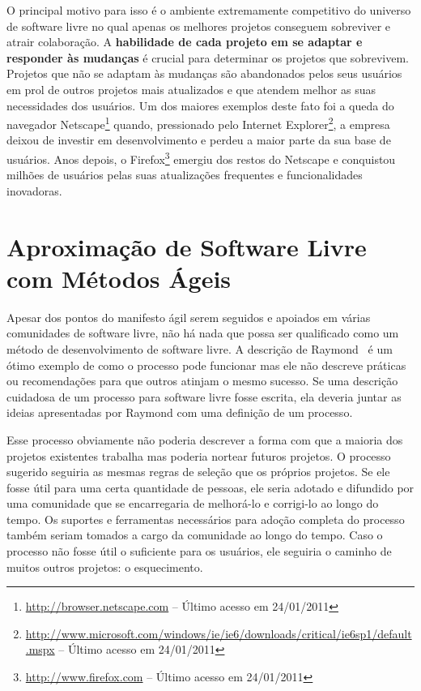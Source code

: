 O principal motivo para isso é o ambiente extremamente competitivo do
universo de software livre no qual apenas os melhores projetos
conseguem sobreviver e atrair colaboração. A \textbf{habilidade de
  cada projeto em se adaptar e responder às mudanças} é crucial para
determinar os projetos que sobrevivem.  Projetos que não se adaptam às
mudanças são abandonados pelos seus usuários em prol de outros
projetos mais atualizados e que atendem melhor as suas necessidades
dos usuários.  Um dos maiores exemplos deste fato foi a queda do
navegador Netscape\footnote{\url{http://browser.netscape.com} --
  Último acesso em 24/01/2011} quando, pressionado pelo Internet
Explorer\footnote{\url{http://www.microsoft.com/windows/ie/ie6/downloads/critical/ie6sp1/default.mspx}
  -- Último acesso em 24/01/2011}, a empresa deixou de investir em
desenvolvimento e perdeu a maior parte da sua base de usuários. Anos
depois, o Firefox\footnote{\url{http://www.firefox.com} -- Último
  acesso em 24/01/2011} emergiu dos restos do Netscape e conquistou
milhões de usuários pelas suas atualizações frequentes e
funcionalidades inovadoras.

\section{Aproximação de Software Livre com Métodos Ágeis}
\label{sec:agile?}

Apesar dos pontos do manifesto ágil serem seguidos e apoiados em
várias comunidades de software livre, não há nada que possa ser
qualificado como um método de desenvolvimento de software livre. A
descrição de Raymond~\cite{Raymond1999} é um ótimo exemplo de como o
processo pode funcionar mas ele não descreve práticas ou recomendações
para que outros atinjam o mesmo sucesso. Se uma descrição cuidadosa de
um processo para software livre fosse escrita, ela deveria juntar as
ideias apresentadas por Raymond com uma definição de um processo.

Esse processo obviamente não poderia descrever a forma com que a
maioria dos projetos existentes trabalha mas poderia nortear futuros
projetos. O processo sugerido seguiria as mesmas regras de seleção que
os próprios projetos. Se ele fosse útil para uma certa quantidade de
pessoas, ele seria adotado e difundido por uma comunidade que se
encarregaria de melhorá-lo e corrigi-lo ao longo do tempo. Os suportes
e ferramentas necessários para adoção completa do processo também
seriam tomados a cargo da comunidade ao longo do tempo. Caso o
processo não fosse útil o suficiente para os usuários, ele seguiria o
caminho de muitos outros projetos: o esquecimento.

